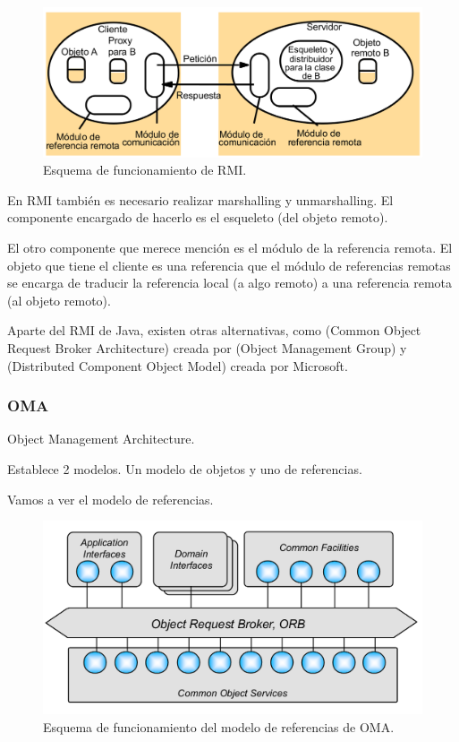 \begin{figure}[hbtp]
\centering
\includegraphics[width=1\textwidth]{img/RMI.png}
\caption{Esquema de funcionamiento de RMI.}
\label{RMI}
\end{figure}

En RMI también es necesario realizar marshalling y unmarshalling. El componente encargado de hacerlo es el esqueleto (del objeto remoto).

El otro componente que merece mención es el módulo de la referencia remota. El objeto que tiene el cliente es una referencia que el módulo de referencias remotas se encarga de traducir la referencia local (a algo remoto) a una referencia remota (al objeto remoto).

Aparte del RMI de Java, existen otras alternativas, como  (Common Object Request Broker Architecture) creada por  (Object Management Group) y  (Distributed Component Object Model) creada por Microsoft.

\subsubsection{OMA}
\begin{defn}[OMA]
Object Management Architecture.

Establece 2 modelos. Un modelo de objetos y uno de referencias.
\end{defn}

Vamos a ver el modelo de referencias.


\begin{figure}[hbtp]
\centering
\includegraphics[width=1\textwidth]{img/OMA_Ref.png}
\caption{Esquema de funcionamiento del modelo de referencias de OMA.}
\label{OMAimg}
\end{figure}

